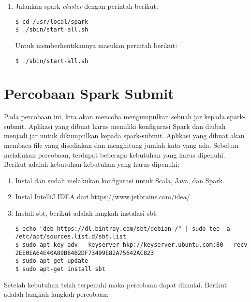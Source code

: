 \begin{enumerate}
\item Jalankan spark \textit{cluster} dengan perintah berikut:

\begin{verbatim}
$ cd /usr/local/spark
$ ./sbin/start-all.sh
\end{verbatim}
Untuk memberhentikannya masukan perintah berikut:
\begin{verbatim}
$ ./sbin/start-all.sh
\end{verbatim}


\end{enumerate}

\section{Percobaan Spark Submit}

Pada percobaan ini, kita akan mencoba mengumpulkan sebuah jar kepada spark-submit. Aplikasi yang dibuat harus memiliki konfigurasi Spark dan diubah menjadi jar untuk dikumpulkan kepada spark-submit. Aplikasi yang dibuat akan membaca file yang disediakan dan menghitung jumlah kata yang ada. Sebelum melakukan percobaan, terdapat beberapa kebutuhan yang harus dipenuhi. Berikut adalah kebutuhan-kebutuhan yang harus dipenuhi:

\begin{enumerate}

\item Instal dan sudah melakukan konfigurasi untuk Scala, Java, dan Spark.

\item Instal IntelliJ IDEA dari https://www.jetbrains.com/idea/.

\item Install sbt, berikut adalah langkah instalasi sbt:

\begin{verbatim}
$ echo "deb https://dl.bintray.com/sbt/debian /" | sudo tee -a /etc/apt/sources.list.d/sbt.list
$ sudo apt-key adv --keyserver hkp://keyserver.ubuntu.com:80 --recv 2EE0EA64E40A89B84B2DF73499E82A75642AC823
$ sudo apt-get update
$ sudo apt-get install sbt
\end{verbatim}


\end{enumerate}

Setelah kebutuhan telah terpenuhi maka percobaan dapat dimulai. Berikut adalah langkah-langkah percobaan:

